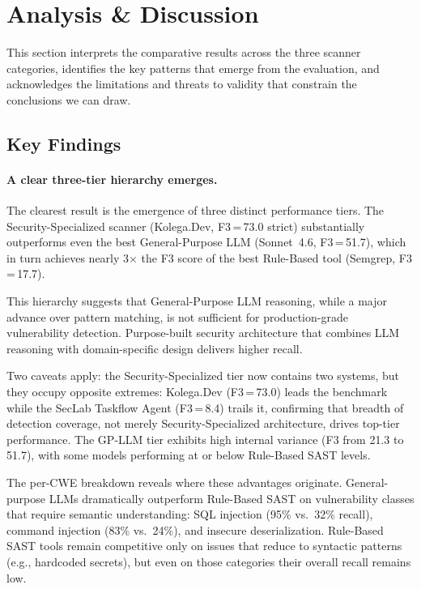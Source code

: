 \section{Analysis \& Discussion}
\label{sec:discussion}

This section interprets the comparative results across the three scanner
categories, identifies the key patterns that emerge from the evaluation, and
acknowledges the limitations and threats to validity that constrain
the conclusions we can draw.

\subsection{Key Findings}
\label{sec:key-findings}

\paragraph{A clear three-tier hierarchy emerges.}
The clearest result is the emergence of three distinct performance
tiers.  The Security-Specialized scanner (Kolega.Dev, F3\,=\,73.0 strict)
substantially outperforms even the best General-Purpose LLM (Sonnet~4.6,
F3\,=\,51.7), which in turn achieves nearly 3$\times$ the F3 score of
the best Rule-Based tool (Semgrep, F3\,=\,17.7).

This hierarchy suggests that General-Purpose LLM reasoning, while a
major advance over pattern matching, is not sufficient for
production-grade vulnerability detection.  Purpose-built security
architecture that combines LLM reasoning with domain-specific
design delivers higher recall.

Two caveats apply: the Security-Specialized tier now contains two systems, but they occupy opposite extremes: Kolega.Dev (F3\,=\,73.0) leads the benchmark while the SecLab Taskflow Agent (F3\,=\,8.4) trails it, confirming that breadth of detection coverage, not merely Security-Specialized architecture, drives top-tier performance. The GP-LLM tier exhibits high internal variance (F3 from 21.3 to 51.7), with some models performing at or below Rule-Based SAST levels.

The per-CWE breakdown reveals where these advantages originate.
General-purpose LLMs dramatically outperform Rule-Based SAST on
vulnerability classes that require semantic understanding: SQL injection
(95\% vs.\ 32\% recall), command injection (83\% vs.\ 24\%), and
insecure deserialization.  Rule-Based SAST tools remain competitive only
on issues that reduce to syntactic patterns (e.g., hardcoded secrets),
but even on those categories their overall recall remains low.

